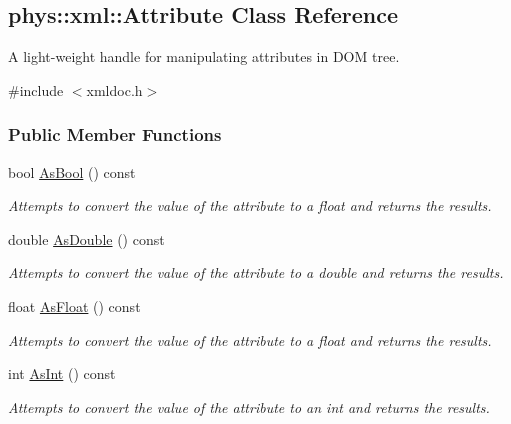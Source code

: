 \hypertarget{classphys_1_1xml_1_1Attribute}{
\subsection{phys::xml::Attribute Class Reference}
\label{classphys_1_1xml_1_1Attribute}
}


A light-\/weight handle for manipulating attributes in DOM tree.  




{\ttfamily \#include $<$xmldoc.h$>$}

\subsubsection*{Public Member Functions}
\begin{DoxyCompactItemize}
\item 
bool \hyperlink{classphys_1_1xml_1_1Attribute_a1c3e0f3a1722aac6a43daa135fdf622e}{AsBool} () const 
\begin{DoxyCompactList}\small\item\em Attempts to convert the value of the attribute to a float and returns the results. \item\end{DoxyCompactList}\item 
double \hyperlink{classphys_1_1xml_1_1Attribute_a467ae167d5407ae3293a22b8873cb43a}{AsDouble} () const 
\begin{DoxyCompactList}\small\item\em Attempts to convert the value of the attribute to a double and returns the results. \item\end{DoxyCompactList}\item 
float \hyperlink{classphys_1_1xml_1_1Attribute_aad74f805b9318735011d698ee39113aa}{AsFloat} () const 
\begin{DoxyCompactList}\small\item\em Attempts to convert the value of the attribute to a float and returns the results. \item\end{DoxyCompactList}\item 
int \hyperlink{classphys_1_1xml_1_1Attribute_ada1f2e45ce636ad8482972263364e7fa}{AsInt} () const 
\begin{DoxyCompactList}\small\item\em Attempts to convert the value of the attribute to an int and returns the results. \item\end{DoxyCompactList}\item 

\end{DoxyCompactItemize}
